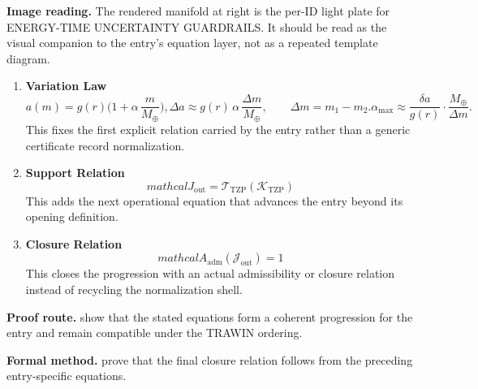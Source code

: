 \begin{samepage}
\noindent\begin{minipage}[t]{0.45\linewidth}
\vspace{0pt}
\raggedright
\scriptsize\textbf{Image reading.} The rendered manifold at right is the per-ID light plate for ENERGY-TIME UNCERTAINTY GUARDRAILS. It should be read as the visual companion to the entry's equation layer, not as a repeated template diagram.\par
\end{minipage}\hfill
\begin{minipage}[t]{0.53\linewidth}
\vspace*{-0.10in}
\raggedright
{}
\end{minipage}
\end{samepage}

\clearpage


\begin{enumerate}[leftmargin=1.6em,itemsep=9pt,topsep=6pt]
\item \textbf{Variation Law}
\[
a(m)=g(r)\big(1+\alpha\,\frac{m}{M_\oplus}\big), \Delta a \approx g(r)\,\alpha\,\frac{\Delta m}{M_\oplus},\qquad \Delta m=m_1-m_2. \boxed{\alpha_{\max}\approx\frac{\delta a}{g(r)}\cdot\frac{M_\oplus}{\Delta m}.}
\]
This fixes the first explicit relation carried by the entry rather than a generic certificate record normalization.

\item \textbf{Support Relation}
\[
mathcal{J}_{\mathrm{out}} = \mathcal{T}_{\mathrm{TZP}}\!\left(\mathcal{K}_{\mathrm{TZP}}\right)
\]
This adds the next operational equation that advances the entry beyond its opening definition.

\item \textbf{Closure Relation}
\[
mathcal{A}_{\mathrm{adm}}\!\left(\mathcal{J}_{\mathrm{out}}\right)=1
\]
This closes the progression with an actual admissibility or closure relation instead of recycling the normalization shell.
\end{enumerate}

\textbf{Proof route.} show that the stated equations form a coherent progression for the entry and remain compatible under the TRAWIN ordering.

\textbf{Formal method.} prove that the final closure relation follows from the preceding entry-specific equations.

